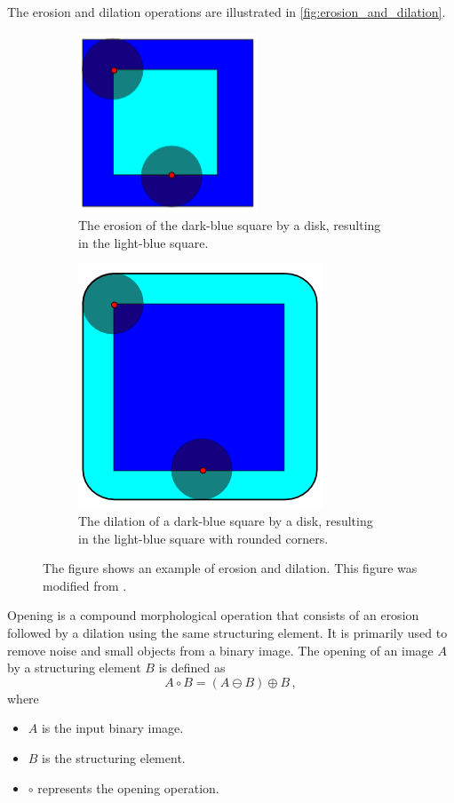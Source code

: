 The erosion and dilation operations are illustrated in \autoref{fig:erosion_and_dilation}.
\begin{figure}[h]
  \centering
  \begin{subfigure}[t]{0.45\textwidth}
    \centering
    \includegraphics[width=0.5\linewidth]{figures/detection/erosion.png}
    \caption{The erosion of the dark-blue square by a disk, resulting in the light-blue square.}
    \label{fig:erosion}
  \end{subfigure}
  \quad
  \begin{subfigure}[t]{0.45\textwidth}
    \centering
    \includegraphics[width=0.5\linewidth]{figures/detection/dilation.png}
    \caption{The dilation of a dark-blue square by a disk, resulting in the light-blue square with rounded corners.}
    \label{fig:dilation}
  \end{subfigure}
  \caption{The figure shows an example of erosion and dilation. This figure was modified from \cite{Renatokeshet_2023}.}
  \label{fig:erosion_and_dilation}
\end{figure}

Opening is a compound morphological operation that consists of an erosion followed by a dilation using the same structuring element. It is primarily used to remove noise and small objects from a binary image. The opening of an image $A$ by a structuring element $B$ is defined as
\begin{equation}
  A \circ B = (A \ominus B) \oplus B\,,
  \label{eq:opening}
\end{equation}
where
\begin{itemize}
  \item $A$ is the input binary image.
  \item $B$ is the structuring element.
  \item $\circ$ represents the opening operation.
\end{itemize}

